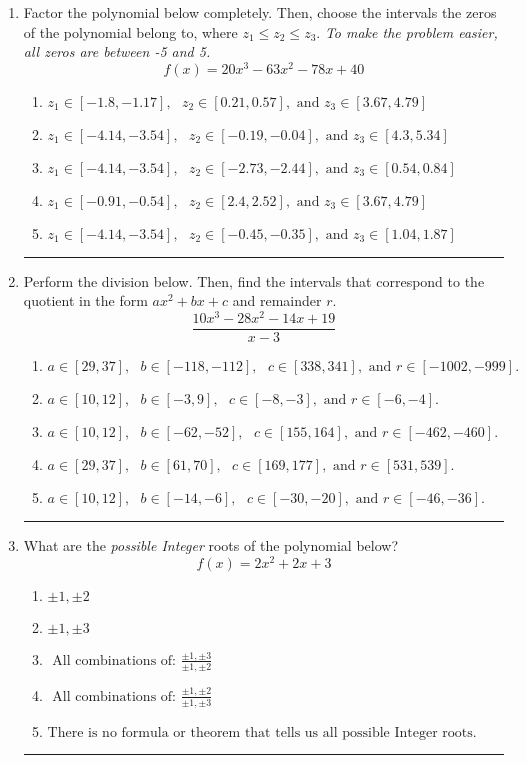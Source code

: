 \documentclass[14pt]{extbook}
\newcommand{\litem}[1]{\item#1\hspace*{-1cm}\rule{\textwidth}{0.4pt}}
\begin{document}
\begin{enumerate}
{\begin{enumerate}[label=\Alph*.]
\end{enumerate} }
\litem{
Factor the polynomial below completely. Then, choose the intervals the zeros of the polynomial belong to, where $z_1 \leq z_2 \leq z_3$. \textit{To make the problem easier, all zeros are between -5 and 5.}\[ f(x) = 20x^{3} -63 x^{2} -78 x + 40 \]\begin{enumerate}[label=\Alph*.]
\item \( z_1 \in [-1.8, -1.17], \text{   }  z_2 \in [0.21, 0.57], \text{   and   } z_3 \in [3.67, 4.79] \)
\item \( z_1 \in [-4.14, -3.54], \text{   }  z_2 \in [-0.19, -0.04], \text{   and   } z_3 \in [4.3, 5.34] \)
\item \( z_1 \in [-4.14, -3.54], \text{   }  z_2 \in [-2.73, -2.44], \text{   and   } z_3 \in [0.54, 0.84] \)
\item \( z_1 \in [-0.91, -0.54], \text{   }  z_2 \in [2.4, 2.52], \text{   and   } z_3 \in [3.67, 4.79] \)
\item \( z_1 \in [-4.14, -3.54], \text{   }  z_2 \in [-0.45, -0.35], \text{   and   } z_3 \in [1.04, 1.87] \)

\end{enumerate} }
\litem{
Perform the division below. Then, find the intervals that correspond to the quotient in the form $ax^2+bx+c$ and remainder $r$.\[ \frac{10x^{3} -28 x^{2} -14 x + 19}{x -3} \]\begin{enumerate}[label=\Alph*.]
\item \( a \in [29, 37], \text{   } b \in [-118, -112], \text{   } c \in [338, 341], \text{   and   } r \in [-1002, -999]. \)
\item \( a \in [10, 12], \text{   } b \in [-3, 9], \text{   } c \in [-8, -3], \text{   and   } r \in [-6, -4]. \)
\item \( a \in [10, 12], \text{   } b \in [-62, -52], \text{   } c \in [155, 164], \text{   and   } r \in [-462, -460]. \)
\item \( a \in [29, 37], \text{   } b \in [61, 70], \text{   } c \in [169, 177], \text{   and   } r \in [531, 539]. \)
\item \( a \in [10, 12], \text{   } b \in [-14, -6], \text{   } c \in [-30, -20], \text{   and   } r \in [-46, -36]. \)

\end{enumerate} }
\litem{
What are the \textit{possible Integer} roots of the polynomial below?\[ f(x) = 2x^{2} +2 x + 3 \]\begin{enumerate}[label=\Alph*.]
\item \( \pm 1,\pm 2 \)
\item \( \pm 1,\pm 3 \)
\item \( \text{ All combinations of: }\frac{\pm 1,\pm 3}{\pm 1,\pm 2} \)
\item \( \text{ All combinations of: }\frac{\pm 1,\pm 2}{\pm 1,\pm 3} \)
\item \( \text{There is no formula or theorem that tells us all possible Integer roots.} \)


\end{enumerate}}
\end{enumerate}
\end{document}
